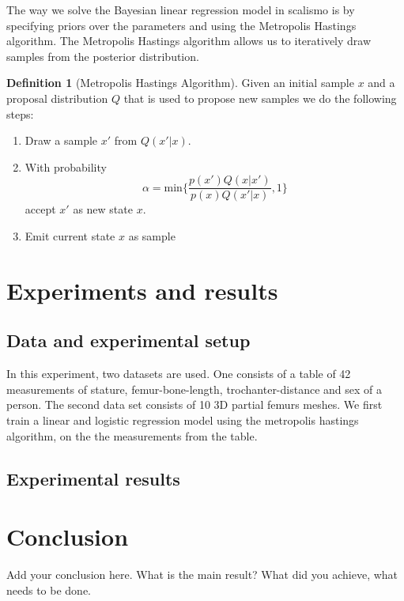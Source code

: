 \documentclass[10pt]{article}
\theoremstyle{definition}
\newtheorem{definition}{Definition}[section]
\begin{document}
The way we solve the Bayesian linear regression model in scalismo is by specifying priors over the parameters and using the Metropolis Hastings algorithm. The Metropolis Hastings algorithm allows us to iteratively draw samples from the posterior distribution.

\begin{definition}[Metropolis Hastings Algorithm]
Given an initial sample $x$ and a proposal distribution $Q$ that is used to propose new samples we do the following steps:
\begin{enumerate}
\item Draw a sample $x'$ from $Q(x'|x)$.
\item With probability $$\alpha=\text{min}\{\frac{p(x')Q(x|x')}{p(x)Q(x'|x)},1\}$$
accept $x'$ as new state $x$.
\item Emit current state $x$ as sample
\end{enumerate}


\end{definition}







\section{Experiments and results}

\subsection{Data and experimental setup}
In this experiment, two datasets are used. One consists of a table of 42 measurements of stature, femur-bone-length, trochanter-distance and sex of a person. The second data set consists of 10 3D partial femurs meshes. We first train a linear and logistic regression model using the metropolis hastings algorithm, on the the measurements from the table.
\subsection{Experimental results}


\section{Conclusion}

Add your conclusion here. What is the main result? What did you achieve, what 
needs to be done. 
\end{document}
